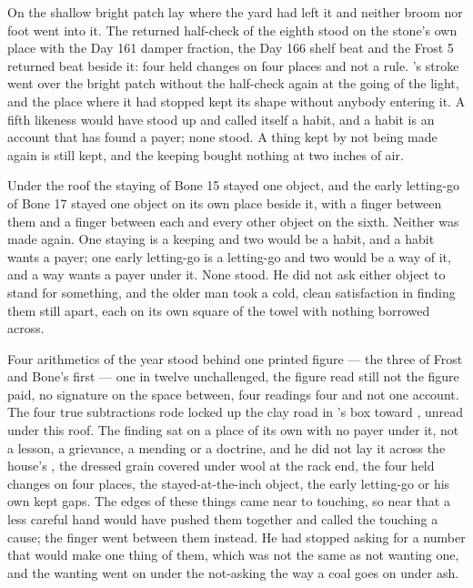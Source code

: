 \scenebreak

On  the shallow bright patch lay where the yard had left it and neither broom nor foot went into it. The returned half-check of the eighth stood on the stone's own place with the Day 161 damper fraction, the Day 166 shelf beat and the Frost 5 returned beat beside it: four held changes on four places and not a rule. 's stroke went over the bright patch without the half-check again at the going of the light, and the place where it had stopped kept its shape without anybody entering it. A fifth likeness would have stood up and called itself a habit, and a habit is an account that has found a payer; none stood. A thing kept by not being made again is still kept, and the keeping bought nothing at two inches of air.

Under the roof the staying of Bone 15 stayed one object, and the early letting-go of Bone 17 stayed one object on its own place beside it, with a finger between them and a finger between each and every other object on the sixth. Neither was made again. One staying is a keeping and two would be a habit, and a habit wants a payer; one early letting-go is a letting-go and two would be a way of it, and a way wants a payer under it. None stood. He did not ask either object to stand for something, and the older man took a cold, clean satisfaction in finding them still apart, each on its own square of the towel with nothing borrowed across.

\scenebreak

Four arithmetics of the year stood behind one printed figure --- the three of Frost and Bone's first --- one in twelve unchallenged, the figure read still not the figure paid, no signature on the space between, four readings four and not one account. The four true subtractions rode locked up the clay road in 's box toward , unread under this roof. The finding sat on a place of its own with no payer under it, not a lesson, a grievance, a mending or a doctrine, and he did not lay it across the house's , the dressed grain covered under wool at the rack end, the four held changes on four places, the stayed-at-the-inch object, the early letting-go or his own kept gaps. The edges of these things came near to touching, so near that a less careful hand would have pushed them together and called the touching a cause; the finger went between them instead. He had stopped asking for a number that would make one thing of them, which was not the same as not wanting one, and the wanting went on under the not-asking the way a coal goes on under ash.

